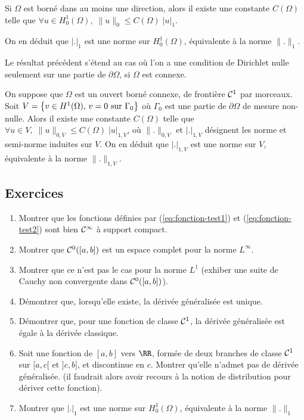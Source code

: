 %
\begin{theorem}
  \label{thr:11}
  Si $\Omega$ est born\'e dans au moins une direction, alors il existe une
  constante $C(\Omega)$ telle que $\forall u \in H^1_0(\Omega), \; \|u\|_0 \le
  C(\Omega)\; |u|_1$.
\end{theorem}

%
On en d\'eduit que $|.|_1$ est une norme sur $H^1_0(\Omega)$, \'equivalente \`a la norme $\|.\|_1$.
%

%
%
\begin{corollary}
  Le r\'esultat pr\'ec\'edent s'\'etend au cas o\`u l'on a une condition de
  Dirichlet nulle seulement sur une partie de $\partial\Omega$, si $\Omega$
  est connexe.
\end{corollary}

On suppose que $\Omega$ est un ouvert born\'e connexe, de fronti\`ere ${\cal
C}^1$ par morceaux. Soit $V=\left\{ v\in H^1(\Omega),\, v=0 \hbox{ sur
  }\Gamma_0 \right\}$ o\`u $\Gamma_0$ est une partie de $\partial\Omega$ de
mesure non-nulle. Alors il existe une constante $C(\Omega)$ telle que $\forall
u \in V, \; \|u\|_{0,V} \le C(\Omega)\; |u|_{1,V}$, o\`u $\|.\|_{0,V}$ et
$|.|_{1,V}$ d\'esignent les norme et semi-norme induites sur $V$.
%
On en d\'eduit que $|.|_{1,V}$ est une norme sur $V$, \'equivalente \`a la norme $\|.\|_{1,V}$.
%
%
\small
~\vspace*{5mm}\\
\subsection*{Exercices}
%
\begin{enumerate}
\item Montrer que les fonctions d\'efinies par (\ref{eq:fonction-test1}) et
  (\ref{eq:fonction-test2}) sont bien ${\cal C}^\infty$ \`a support compact.
\item Montrer que ${\cal C}^0([a,b])$ est un espace complet pour la norme $L^\infty$.
\item Montrer que ce n'est pas le cas pour la norme $L^1$ (exhiber une suite
  de Cauchy non convergente dans ${\cal C}^0([a,b])$).
%
\item D\'emontrer que, lorsqu'elle existe, la d\'eriv\'ee g\'en\'eralis\'ee est unique.
\item D\'emontrer que, pour une fonction de classe ${\cal C}^1$, la
  d\'eriv\'ee g\'en\'eralis\'ee est \'egale \`a la d\'eriv\'ee classique.
\item Soit une fonction de $[a,b]$ vers $\RR$, form\'ee de deux branches de
  classe ${\cal C}^1$ sur $[a,c[$ et $]c,b]$, et discontinue en $c$.  Montrer
  qu'elle n'admet pas de d\'eriv\'ee g\'en\'eralis\'ee. (il faudrait alors
  avoir recours \`a la notion de distribution pour d\'eriver cette fonction).
\item Montrer que $|.|_1$ est une norme sur $H^1_0(\Omega)$, \'equivalente \`a la norme $\|.\|_1$
\end{enumerate}

